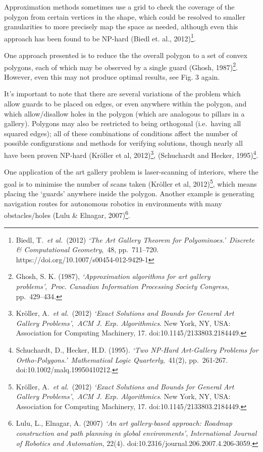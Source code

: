 \documentclass[
]{article}
\begin{document}
Approximation methods sometimes use a grid to check the coverage of the
polygon from certain vertices in the shape, which could be resolved to
smaller granularities to more precisely map the space as needed,
although even this approach has been found to be NP-hard (Biedl et. al.,
2012)\footnote{Biedl, T.~\emph{et al.}~(2012) \emph{`The Art Gallery
  Theorem for Polyominoes.'}~\emph{Discrete \& Computational
  Geometry},~48, pp.~711--720. https://doi.org/10.1007/s00454-012-9429-1}.

One approach presented is to reduce the the overall polygon to a set of
convex polygons, each of which may be observed by a single guard (Ghosh,
1987)\footnote{Ghosh, S. K. (1987), \emph{`Approximation algorithms for
  art gallery problems'},~\emph{Proc. Canadian Information Processing
  Society Congress}, pp.~429--434.}. However, even this may not produce
optimal results, see Fig. 3 again.

It's important to note that there are several variations of the problem
which allow guards to be placed on edges, or even anywhere within the
polygon, and which allow/disallow holes in the polygon (which are
analogous to pillars in a gallery). Polygons may also be restricted to
being orthogonal (i.e.~having all squared edges); all of these
combinations of conditions affect the number of possible configurations
and methods for verifying solutions, though nearly all have been proven
NP-hard (Kröller et al, 2012)\footnote{Kröller, A.~\emph{et al.}~(2012)
  \emph{`Exact Solutions and Bounds for General Art Gallery
  Problems'},~\emph{ACM J. Exp. Algorithmics}. New York, NY, USA:
  Association for Computing Machinery, 17. doi:10.1145/2133803.2184449.},
(Schuchardt and Hecker, 1995)\footnote{Schuchardt, D., Hecker, H.D.
  (1995). \emph{`Two NP‐Hard Art‐Gallery Problems for
  Ortho‐Polygons.'}~\emph{Mathematical Logic Quarterly},~41(2),
  pp.~261-267. doi:10.1002/malq.19950410212.}.

One application of the art gallery problem is laser-scanning of
interiors, where the goal is to minimise the number of scans taken
(Kröller et al, 2012)\footnote{Kröller, A.~\emph{et al.}~(2012)
  \emph{`Exact Solutions and Bounds for General Art Gallery
  Problems'},~\emph{ACM J. Exp. Algorithmics}. New York, NY, USA:
  Association for Computing Machinery, 17. doi:10.1145/2133803.2184449.},
which means placing the `guards' anywhere inside the polygon. Another
example is generating navigation routes for autonomous robotics in
environments with many obstacles/holes (Lulu \& Elnagar,
2007)\footnote{Lulu, L., Elnagar, A. (2007) \emph{`An art gallery-based
  approach: Roadmap construction and path planning in global
  environments'}, \emph{International Journal of Robotics and
  Automation}, 22(4). doi:10.2316/journal.206.2007.4.206-3059.}.
\end{document}
